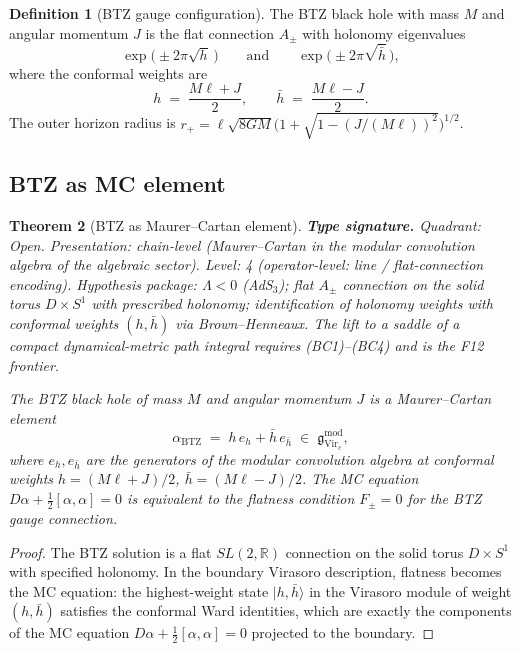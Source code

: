 \documentclass[11pt,reqno]{amsart}
\newtheorem{theorem}{Theorem}[section]
\theoremstyle{definition}
\newtheorem{definition}[theorem]{Definition}
\theoremstyle{remark}
\begin{document}
\begin{definition}[BTZ gauge configuration]
\label{def:btz-gauge}
The BTZ black hole with mass $M$ and angular momentum $J$ is the
flat connection $A_\pm$ with holonomy eigenvalues
\begin{equation}\label{eq:btz-holonomy}
\exp\!\bigl(\pm 2\pi\sqrt{h}\,\bigr)
\qquad\text{and}\qquad
\exp\!\bigl(\pm 2\pi\sqrt{\bar{h}}\,\bigr),
\end{equation}
where the conformal weights are
\begin{equation}\label{eq:btz-conformal-weights}
h \;=\; \frac{M\ell + J}{2},
\qquad
\bar{h} \;=\; \frac{M\ell - J}{2}.
\end{equation}
The outer horizon radius is
$r_+ = \ell\sqrt{8GM}
\bigl(1 + \sqrt{1 - (J/(M\ell))^2}\bigr)^{1/2}$.
\end{definition}

\subsection{BTZ as MC element}

\begin{theorem}[BTZ as Maurer--Cartan element]
\label{thm:btz-mc}
\textbf{Type signature.} Quadrant: Open.
Presentation: chain-level (Maurer--Cartan in the modular
convolution algebra of the algebraic sector).
Level: 4 (operator-level: line / flat-connection encoding).
Hypothesis package: $\Lambda < 0$ (AdS$_3$); flat $A_\pm$
connection on the solid torus $D \times S^1$ with prescribed
holonomy; identification of holonomy weights with conformal
weights $(h, \bar h)$ via Brown--Henneaux. The lift to a saddle
of a compact dynamical-metric path integral requires (BC1)--(BC4)
and is the F12 frontier.

The BTZ black hole of mass $M$ and angular momentum $J$ is
a Maurer--Cartan element
\begin{equation}\label{eq:btz-mc}
\alpha_{\mathrm{BTZ}}
\;=\;
h\,e_h + \bar{h}\,e_{\bar{h}}
\;\in\;
\mathfrak{g}^{\mathrm{mod}}_{\mathrm{Vir}_c},
\end{equation}
where $e_h, e_{\bar{h}}$ are the generators of the modular
convolution algebra at conformal weights $h = (M\ell + J)/2$,
$\bar{h} = (M\ell - J)/2$. The MC equation
$D\alpha + \frac{1}{2}[\alpha, \alpha] = 0$ is equivalent to the
flatness condition $F_\pm = 0$ for the BTZ gauge connection.
\end{theorem}

\begin{proof}
The BTZ solution is a flat $SL(2,\mathbb{R})$ connection on the
solid torus $D \times S^1$ with specified holonomy. In the boundary
Virasoro description, flatness becomes the MC equation: the
highest-weight state $|h, \bar{h}\rangle$ in the Virasoro module
of weight $(h, \bar{h})$ satisfies the conformal Ward identities,
which are exactly the components of the MC equation
$D\alpha + \frac{1}{2}[\alpha, \alpha] = 0$ projected to the
boundary.
\end{proof}
\end{document}
